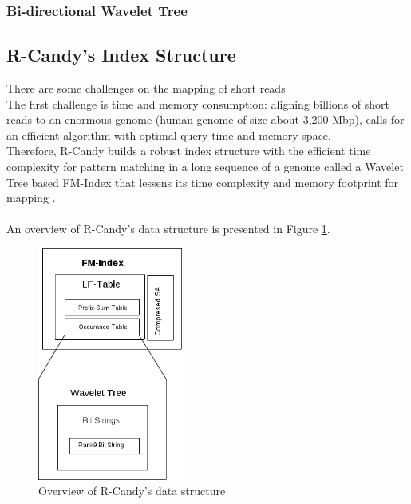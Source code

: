 \documentclass[11pt,a4paper]{report}
\begin{document}


\subsubsection{Bi-directional Wavelet Tree}







\subsection{R-Candy's Index Structure} \label{R-Candy's Index Structure}

There are some challenges on the mapping of short reads\\
The first challenge is time and memory consumption: aligning billions of short
reads to an enormous genome (human genome of size about 3,200 Mbp), 
calls for an efficient algorithm with optimal query time and memory space.\\
Therefore, R-Candy builds a robust index structure with 
the efficient time complexity for pattern matching in a long sequence of a genome
called a Wavelet Tree based FM-Index that lessens its time complexity and memory footprint for mapping . 
\\\\
An overview of R-Candy's data structure is presented in Figure \ref{DSOverview}\cite{Wavthesis}.\\

\begin{figure}[H]
\centering
\includegraphics[width=4.75cm]{pictures/DSOverview2.png}
\caption{Overview of R-Candy's data structure }
\label{DSOverview}
\end{figure}
\end{document}
